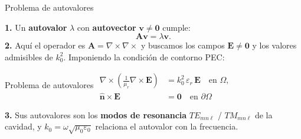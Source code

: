 \documentclass{beamer}
\begin{document}
\begin{frame}{Problema de autovalores}
  \vspace{-0.25cm}
  \setlength{\abovedisplayskip}{2pt}
  \setlength{\belowdisplayskip}{2pt}
  \begin{center}
  \begin{minipage}{0.94\textwidth}
    \small
    \textbf{1.} Un \textbf{autovalor} $\lambda$ con \textbf{autovector}
    $\mathbf{v}\neq\mathbf{0}$ cumple:
    \[
      \mathbf{A}\mathbf{v} = \lambda\mathbf{v}.
    \]
    \textbf{2.} Aquí el operador es $\mathbf{A}=\nabla\times\nabla\times$ y
    buscamos los campos $\mathbf{E}\neq\mathbf{0}$ y los valores admisibles de
    $k_0^2$. Imponiendo la condición de contorno PEC:
    \begin{block}{Problema de autovalores}
      \centering
      $\displaystyle
      \begin{aligned}
        \nabla \times \left( \frac{1}{\mu_r} \nabla \times \mathbf{E} \right)
          &= k_0^2\, \varepsilon_r\, \mathbf{E} \quad \text{en } \Omega, \\
        \hat{\mathbf{n}} \times \mathbf{E} &= \mathbf{0} \quad \text{en } \partial\Omega
      \end{aligned}$
    \end{block}
    \textbf{3.} Sus autovalores son los \textbf{modos de resonancia}
    $TE_{mn\ell}$ / $TM_{mn\ell}$ de la cavidad, y
    $k_0 = \omega\sqrt{\mu_0\varepsilon_0}$ relaciona el autovalor con la
    frecuencia.
  \end{minipage}
  \end{center}
\end{frame}
\end{document}
